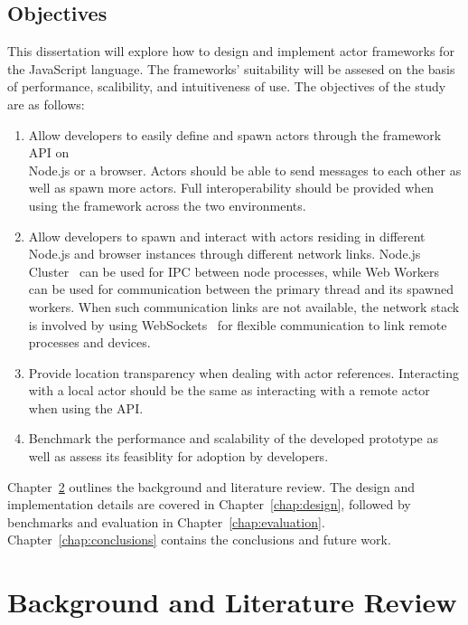 \documentclass[oneside]{um-fict}
\begin{document}
\section{Objectives}\label{section:objectives}
This dissertation will explore how to design and implement actor frameworks for the JavaScript language. The frameworks' suitability will be assesed on the basis of performance, scalibility, and intuitiveness of use. The objectives of the study are as follows:
\begin{enumerate}
    \item Allow developers to easily define and spawn actors through the framework API on \\Node.js or a browser. Actors should be able to send messages to each other as well as spawn more actors. Full interoperability should be provided when using the framework across the two environments.
    \item Allow developers to spawn and interact with actors residing in different Node.js and browser instances through different network links. Node.js Cluster~\cite{cluster} can be used for IPC between node processes, while Web Workers~\cite{webworkers} can be used for communication between the primary thread and its spawned workers. When such communication links are not available, the network stack is involved by using WebSockets~\cite{websocket} for flexible communication to link remote processes and devices.
    \item Provide location transparency when dealing with actor references. Interacting with a local actor should be the same as interacting with a remote actor when using the API.
    \item Benchmark the performance and scalability of the developed prototype as well as assess its feasiblity for adoption by developers.
\end{enumerate}

Chapter~\ref{chap:background} outlines the background and literature review. The design and implementation details are covered in Chapter~\ref{chap:design}, followed by benchmarks and evaluation in Chapter~\ref{chap:evaluation}. Chapter~\ref{chap:conclusions} contains the conclusions and future work.

\chapter{Background and Literature Review}\label{chap:background}
\end{document}

